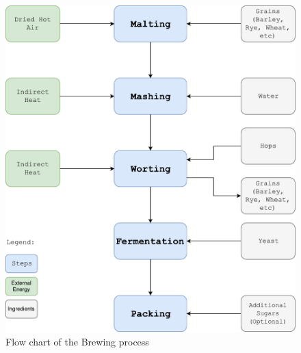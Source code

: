 \documentclass[twoside]{ctuthesis}
\theoremstyle{plain}
\theoremstyle{definition}
\theoremstyle{note}
\begin{document}
\begin{figure}[H]
\centering
\includegraphics[scale = 0.39]{BeerMakingFlowChart}
\caption{Flow chart of the Brewing process}
\end{figure}
\end{document}
